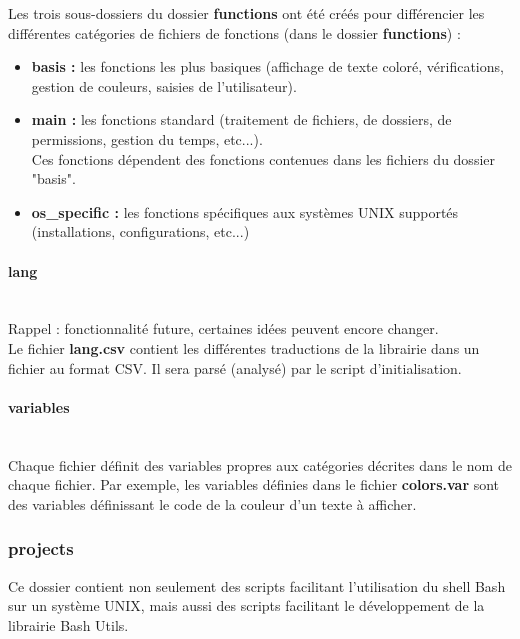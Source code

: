 \documentclass[a4paper,10pt]{article}
\begin{document}
Les trois sous-dossiers du dossier \textbf{functions} ont été créés pour différencier les différentes catégories de fichiers de fonctions (dans le dossier \textbf{functions}) :
\begin{itemize}
    \item \color{lime}\textbf{basis\color{white} :} \color{white} les fonctions les plus basiques (affichage de texte coloré, vérifications, gestion de couleurs, saisies de l'utilisateur).
    
    \item \color{lime}\textbf{main\color{white} :} \color{white} les fonctions standard (traitement de fichiers, de dossiers, de permissions, gestion du temps, etc...).\\[1\baselineskip]

    Ces fonctions dépendent des fonctions contenues dans les fichiers du dossier "basis".\\[1\baselineskip]

    \item \color{lime}\textbf{os\_specific\color{white} :} \color{white} les fonctions spécifiques aux systèmes UNIX supportés (installations, configurations, etc...)
\end{itemize}

\paragraph{lang}\mbox{}\\
Rappel : fonctionnalité future, certaines idées peuvent encore changer.\\[1\baselineskip]

Le fichier \color{lime}\textbf{lang.csv} \color{white} contient les différentes traductions de la librairie dans un fichier au format CSV. Il sera parsé (analysé) par le script d'initialisation.

\paragraph{variables}\mbox{}\\
Chaque fichier définit des variables propres aux catégories décrites dans le nom de chaque fichier. Par exemple, les variables définies dans le fichier \color{lime}\textbf{colors.var}\color{white} sont des variables définissant le code de la couleur d'un texte à afficher.

\color{blue}
\subsubsection{projects}\color{white}
Ce dossier contient non seulement des scripts facilitant l'utilisation du shell Bash sur un système UNIX, mais aussi des scripts facilitant le développement de la librairie Bash Utils.
\end{document}
